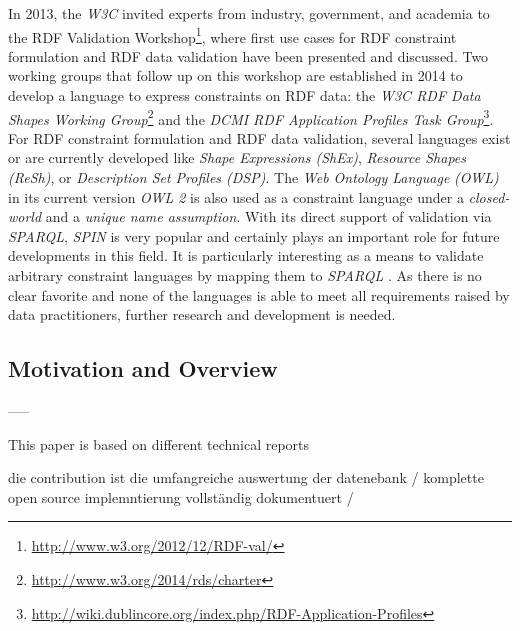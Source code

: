 \documentclass{acm_proc_article-sp}
\begin{document}
In 2013, the \emph{W3C} invited experts from industry, government, and academia to the RDF Validation Workshop\footnote{\url{http://www.w3.org/2012/12/RDF-val/}}, 
where first use cases for RDF constraint formulation and RDF data validation have been presented and discussed. 
Two working groups that follow up on this workshop are established in 2014 to develop a language to express constraints on RDF data: 
the \emph{W3C RDF Data Shapes Working Group}\footnote{\url{http://www.w3.org/2014/rds/charter}} and the \emph{DCMI RDF Application Profiles Task Group}\footnote{\url{http://wiki.dublincore.org/index.php/RDF-Application-Profiles}}. 
For RDF constraint formulation and RDF data validation, several languages exist or are currently developed like \emph{Shape Expressions (ShEx)}, \emph{Resource Shapes (ReSh)}, or \emph{Description Set Profiles (DSP)}. The \emph{Web Ontology Language} \emph{(OWL)} in its current version \emph{OWL 2} is also used as a constraint language under a \emph{closed-world} and a \emph{unique name assumption}. 
With its direct support of validation via \emph{SPARQL}, \emph{SPIN} is very popular and certainly plays an important role for future developments in this field. It is particularly interesting as a means to validate arbitrary constraint languages by mapping them to \emph{SPARQL} \cite{BoschEckert2014-2}. 
As there is no clear favorite and none of the languages is able to meet all requirements raised by data practitioners,
further research and development is needed.

\subsection{Motivation and Overview}
\label{motivation}

-----

This paper is based on different technical reports

die contribution ist die umfangreiche auswertung der datenebank /
komplette open source implemntierung vollständig dokumentuert / 
\end{document}
